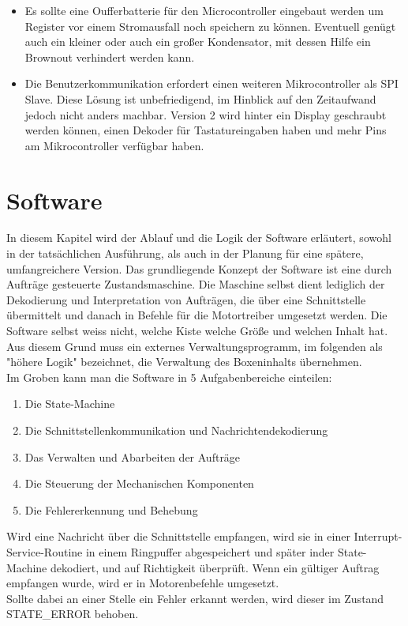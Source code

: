 \documentclass{scrartcl}
\begin{document}
\begin{itemize}
\item{Es sollte eine Oufferbatterie für den Microcontroller eingebaut werden um Register vor einem Stromausfall noch speichern zu können. Eventuell genügt auch ein kleiner oder auch ein großer Kondensator, mit dessen Hilfe ein Brownout verhindert werden kann. }

\item{Die Benutzerkommunikation erfordert einen weiteren Mikrocontroller als SPI Slave. Diese Lösung ist unbefriedigend, im Hinblick auf den Zeitaufwand jedoch nicht anders machbar. Version 2 wird hinter ein Display geschraubt werden können, einen Dekoder für Tastatureingaben haben und mehr Pins am Mikrocontroller verfügbar haben. }
\end{itemize} 



\newpage
\section{Software}

In diesem Kapitel wird der Ablauf und die Logik der Software erläutert, sowohl in der tatsächlichen Ausführung, als auch in der Planung für eine spätere, umfangreichere Version.
Das grundliegende Konzept der Software ist eine durch Aufträge gesteuerte Zustandsmaschine. Die Maschine selbst dient lediglich der Dekodierung und Interpretation von Aufträgen, die über eine Schnittstelle übermittelt  und danach in Befehle für die Motortreiber umgesetzt werden.  Die Software selbst weiss nicht, welche Kiste welche Größe und welchen Inhalt hat. Aus diesem Grund muss ein externes Verwaltungsprogramm,  im folgenden als "höhere Logik" bezeichnet, die Verwaltung des Boxeninhalts übernehmen.\\
Im Groben kann man die Software in 5 Aufgabenbereiche einteilen:
\begin{enumerate}
	\item Die State-Machine
	\item Die Schnittstellenkommunikation und Nachrichtendekodierung
	\item Das Verwalten und Abarbeiten der Aufträge
	\item Die Steuerung der Mechanischen Komponenten
	\item Die Fehlererkennung und Behebung
\end{enumerate}
 Wird eine Nachricht über die Schnittstelle empfangen, wird sie in einer Interrupt-Service-Routine in einem Ringpuffer abgespeichert und später inder State-Machine dekodiert, und auf Richtigkeit überprüft. Wenn ein gültiger Auftrag empfangen wurde, wird er in Motorenbefehle umgesetzt.\\
Sollte dabei an einer Stelle ein Fehler erkannt werden, wird dieser im Zustand STATE\_ERROR behoben.
\end{document}
